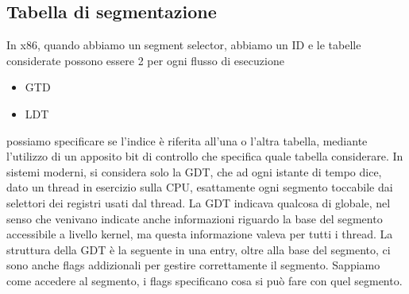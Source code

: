\documentclass[12pt, oneside]{extbook}
\begin{document}
\subsection{Tabella di segmentazione}
In x86, quando abbiamo un segment selector, abbiamo un ID e le tabelle considerate possono essere 2 per ogni flusso di esecuzione
\begin{itemize}
\item GTD
\item LDT
\end{itemize}
possiamo specificare se l'indice è riferita all'una o l'altra tabella, mediante l'utilizzo di un apposito bit di controllo che specifica quale tabella considerare. In sistemi moderni, si considera solo la GDT, che ad ogni istante di tempo dice, dato un thread in esercizio sulla CPU, esattamente ogni segmento toccabile dai selettori dei registri usati dal thread. La GDT indicava qualcosa di globale, nel senso che venivano indicate anche informazioni riguardo la base del segmento accessibile a livello kernel, ma questa informazione valeva per tutti i thread. La struttura della GDT è la seguente
in una entry, oltre alla base del segmento, ci sono anche flags addizionali per gestire correttamente il segmento. Sappiamo come accedere al segmento, i flags specificano cosa si può fare con quel segmento.
\end{document}
